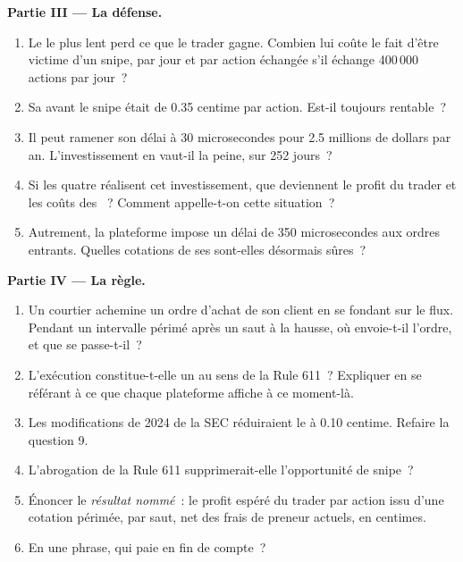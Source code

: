 \begin{problem}
\medskip\noindent\textbf{Partie III --- La défense.}
\begin{enumerate}[resume]
\item Le  le plus lent perd ce que le trader gagne. Combien lui coûte
le fait d'être victime d'un snipe, par jour et par action échangée s'il échange
400\,000 actions par jour~?
\item Sa  avant le snipe était de 0.35 centime par action. Est-il
toujours rentable~?
\item Il peut ramener son délai à 30 microsecondes pour 2.5 millions de dollars par an.
L'investissement en vaut-il la peine, sur 252 jours~?
\item Si les quatre  réalisent cet investissement, que deviennent le profit
du trader et les coûts des ~? Comment appelle-t-on
cette situation~?
\item Autrement, la plateforme impose un délai de 350 microsecondes aux ordres
entrants. Quelles cotations de ses  sont-elles désormais sûres~?
\end{enumerate}

\medskip\noindent\textbf{Partie IV --- La règle.}
\begin{enumerate}[resume]
\item Un courtier achemine un ordre d'achat de son client en se fondant sur le flux. Pendant
un intervalle périmé après un saut à la hausse, où envoie-t-il l'ordre, et que
se passe-t-il~?
\item L'exécution constitue-t-elle un  au sens de la Rule 611~? Expliquer en
se référant à ce que chaque plateforme affiche à ce moment-là.
\item Les modifications de 2024 de la SEC réduiraient le  à 0.10 centime.
Refaire la question 9.
\item L'abrogation de la Rule 611 supprimerait-elle l'opportunité de snipe~?
\item Énoncer le \emph{résultat nommé}~: le profit espéré du trader par action
issu d'une cotation périmée, par saut, net des frais de preneur actuels, en centimes.
\item En une phrase, qui paie en fin de compte~?
\end{enumerate}
\end{problem}


